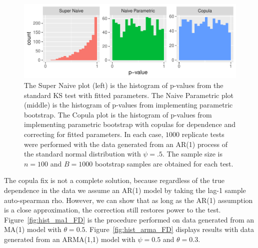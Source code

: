 \documentclass[12pt, letterpaper, titlepage]{article}
\begin{document}
\begin{figure}[tbp]
  \centering
  \includegraphics{hist_ar1_FD}
  \caption{The Super Naive plot (left) is the histogram of p-values from the 
  standard KS test with fitted parameters. The Naive Parametric plot (middle) is
  the histogram of p-values from implementing parametric bootstrap. The Copula 
  plot is the histogram of p-values from implementing parametric bootstrap with 
  copulas for dependence and correcting for fitted parameters. In each case, 
  $1000$ replicate tests were performed with the data generated from an AR(1) 
  process of the standard normal distribution with $\psi = .5$. The sample size 
  is $n = 100$ and $B = 1000$ bootstrap samples are obtained for each test.}
  \label{fig:hist_ar1_FD}
\end{figure}

The copula fix is not a complete solution, because regardless of the true dependence in the data
we assume an AR(1) model by taking the lag-1 sample auto-spearman rho. However, we can 
show that as long as the AR(1) assumption is a close approximation, the correction still restores power to the test.
Figure~\ref{fig:hist_ma1_FD} is the procedure performed on data generated from 
an MA(1) model with $\theta = 0.5$. Figure~\ref{fig:hist_arma_FD} displays results with 
data generated from an ARMA(1,1) model with $\psi = 0.5$ and $\theta = 0.3$. 
\end{document}
